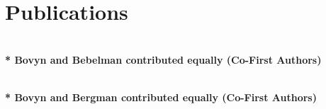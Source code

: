 \documentclass[letterpaper,10pt]{article} %
\begin{document}
\bigskip


\section{Publications}
\bigskip

\begin{description}[itemsep=-1ex]
\item {}
\item {}
\\ \textbf{\** Bovyn and Bebelman contributed equally (Co-First Authors)}
\item {}
\item {}
\item {}
\item {}
\item {}
\item {}
\item {} \\ \textbf{\** Bovyn and Bergman contributed equally (Co-First Authors)}
\item {}
\item {}

%
%
%
%
%

\end{description}
\end{document}

